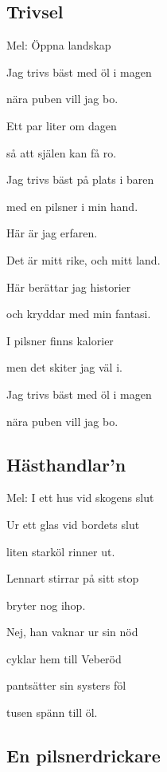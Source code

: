 

\pagestyle{Öhlvisor}



\subsection{\textbf{Trivsel}}

Mel: Öppna landskap \bigskip


Jag trivs bäst med öl i magen

nära puben vill jag bo.

Ett par liter om dagen

så att själen kan få ro.\bigskip

Jag trivs bäst på plats i baren

med en pilsner i min hand.

Här är jag erfaren.

Det är mitt rike, och mitt land.\bigskip

Här berättar jag historier

och kryddar med min fantasi.

I pilsner finns kalorier

men det skiter jag väl i.\bigskip

Jag trivs bäst med öl i magen

nära puben vill jag bo. \bigskip

\subsection{\textbf{Hästhandlar’n}}

Mel: I ett hus vid skogens slut\bigskip


Ur ett glas vid bordets slut

liten starköl rinner ut.

Lennart stirrar på sitt stop

bryter nog ihop.

Nej, han vaknar ur sin nöd

cyklar hem till Veberöd

pantsätter sin systers föl

tusen spänn till öl. 

\subsection{\textbf{En pilsnerdrickare}}

